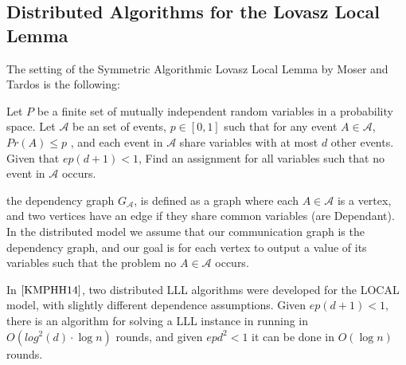 \subsection{Distributed Algorithms for the Lovasz Local Lemma }
The setting of the Symmetric Algorithmic Lovasz Local Lemma by Moser and Tardos \cite{MoserT10} is the following: 
\begin{problem}
Let $P$ be a finite set of mutually independent random variables in a probability space. Let $\mathcal{A}$ be an set of events, $p \in [0,1]$ such that  for any event $A \in \mathcal{A}$, $Pr(A) \leq p$ , and each event in $\mathcal{A}$ share variables with at most $d$ other events. Given that $ep(d+1) < 1$, Find an assignment for all variables such that no event in $\mathcal{A}$ occurs.
\end{problem}

the dependency graph $G_{\mathcal{A}}$, is defined as a graph where each $A \in \mathcal{A}$ is a vertex, and two vertices have an edge if they share common variables (are Dependant). In the distributed model we assume that our communication graph is the dependency graph, and our goal is for each vertex to output a value of its variables such that the problem no $A \in \mathcal{A}$ occurs.

In $\cite{KMPHH14}$, two distributed LLL algorithms were developed for the LOCAL model, with slightly different dependence assumptions. Given  $ep(d+1) < 1$, there is an algorithm  for solving a LLL instance in running in $O(log^2(d) \cdot \log{n})$ rounds, and given $epd^2 < 1$ it can be done in $O(\log{n})$ rounds. 

